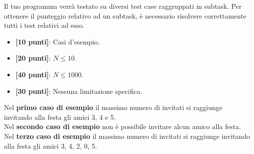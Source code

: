 \Scoring
Il tuo programma verrà testato su diversi test case raggruppati in subtask.
Per ottenere il punteggio relativo ad un subtask, è necessario risolvere
correttamente tutti i test relativi ad esso.

\begin{itemize}[nolistsep,itemsep=2mm]
  \item \textbf{ [10 punti]}: Casi d'esempio.
  \item \textbf{ [20 punti]}: $N \leq 10$.
  \item \textbf{ [40 punti]}: $N \leq 1000$.
  \item \textbf{ [30 punti]}: Nessuna limitazione specifica.
\end{itemize}

\Examples
\begin{example}
%
\end{example}
\begin{example}
%
\end{example}
\begin{example}
%
\end{example}


\Explanation
Nel \textbf{primo caso di esempio} il massimo numero di invitati si raggiunge invitando alla festa gli amici 3, 4 e 5.\\[2mm]
Nel \textbf{secondo caso di esempio} non è possibile invitare alcun amico alla festa.\\[2mm]
Nel \textbf{terzo caso di esempio} il massimo numero di invitati si raggiunge invitando alla festa gli amici 3, 4, 2, 0, 5.
